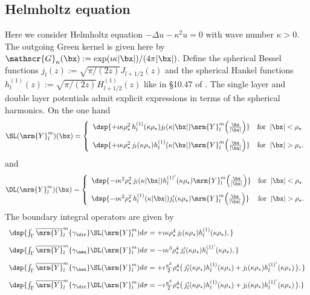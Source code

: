 \documentclass[a4paper,11pt]{article}
\begin{document}
\subsection{Helmholtz equation}\label{Helmholtz3D}

Here we consider Helmholtz equation $-\Delta u-\kappa^{2} u =0$ with wave number $\kappa>0$. The outgoing Green kernel
is given here by $\mathscr{G}_{\kappa}(\bx):=\exp(\imath\kappa\vert\bx\vert)/(4\pi\vert \bx\vert)$.
Define the spherical Bessel functions $j_{l}(z) := \sqrt{\pi/(2z)}J_{l+1/2}(z)$ and the spherical Hankel functions
$h_{l}^{(1)}(z):= \sqrt{\pi/(2z)}H^{(1)}_{l+1/2}(z)$ like in \S 10.47 of \cite{MR2723248}.
The single layer and double layer potentials admit explicit expressions in terms of the spherical harmonics.
On the one hand\\
$$
\SL(\mrm{Y}_{l}^{m})(\bx) =
\left\{\begin{array}{ll}
\dsp{+\imath\kappa\rho_{\star}^{2}\, h^{(1)}_{l}(\kappa\rho_{\star})j_{l}(\kappa\vert \bx\vert)\mrm{Y}_{l}^{m}\Big(\frac{\bx}{\vert\bx\vert}\Big)} & \textrm{for}\;\;\vert \bx\vert<\rho_{\star}\\[10pt]
\dsp{+\imath\kappa\rho_{\star}^{2}\, j_{l}(\kappa\rho_{\star})h^{(1)}_{l}(\kappa\vert \bx\vert)\mrm{Y}_{l}^{m}\Big(\frac{\bx}{\vert\bx\vert}\Big)   } & \textrm{for}\;\;\vert\bx\vert>\rho_{\star}.
\end{array}\right.
$$
and
$$
\DL(\mrm{Y}_{l}^{m})(\bx) =
\left\{\begin{array}{ll}
\dsp{-\imath\kappa^{2}\rho_{\star}^{2}\, j_{l}(\kappa\vert \bx\vert)h^{(1)'}_{l}(\kappa\rho_{\star})
\mrm{Y}_{l}^{m}\Big(\frac{\bx}{\vert\bx\vert}\Big) }
& \textrm{for}\;\;\vert\bx\vert<\rho_{\star}\\[10pt]
\dsp{-\imath\kappa^{2}\rho_{\star}^{2}\, h^{(1)}_{l}(\kappa\vert \bx\vert)j_{l}'(\kappa\rho_{\star})
\mrm{Y}_{l}^{m}\Big(\frac{\bx}{\vert\bx\vert}\Big) }
& \textrm{for}\;\;\vert\bx\vert>\rho_{\star}.
\end{array}\right.
$$
The boundary integral operators are given by
$$
\begin{array}{l}
\dsp{ \int_{\Gamma}\overline{\mrm{Y}}_{l}^{m}\{\gamma_{\dir}\}\SL(\mrm{Y}_{l}^{m}) d\sigma
= +\imath\kappa \rho_{\star}^{4}\,j_{l}(\kappa\rho_{\star})h_{l}^{(1)}(\kappa\rho_{\star}), }\\[10pt]
\dsp{ \int_{\Gamma}\overline{\mrm{Y}}_{l}^{m}\{\gamma_{\neu}\}\DL(\mrm{Y}_{l}^{m}) d\sigma
= -\imath\kappa^{3}\rho_{\star}^{4} \,j_{l}'(\kappa\rho_{\star})h_{l}^{(1)'}(\kappa\rho_{\star}), }\\[10pt]
\dsp{ \int_{\Gamma}\overline{\mrm{Y}}_{l}^{m}\{\gamma_{\neu}\}\SL(\mrm{Y}_{l}^{m}) d\sigma
= +\imath\frac{\kappa^{2}}{2}\rho_{\star}^{4}
\big( \,j_{l}'(\kappa\rho_{\star})h_{l}^{(1)}(\kappa\rho_{\star}) +  j_{l}(\kappa\rho_{\star})h_{l}^{(1)'}(\kappa\rho_{\star})\,\big), }\\[10pt]
\dsp{ \int_{\Gamma}\overline{\mrm{Y}}_{l}^{m}\{\gamma_{\dir}\}\DL(\mrm{Y}_{l}^{m}) d\sigma
= -\imath\frac{\kappa^{2}}{2}\rho_{\star}^{4}
\big( \,j_{l}'(\kappa\rho_{\star})h_{l}^{(1)}(\kappa\rho_{\star}) +
j_{l}(\kappa\rho_{\star})h_{l}^{(1)'}(\kappa\rho_{\star})\,\big). }
\end{array}
$$
\end{document}
